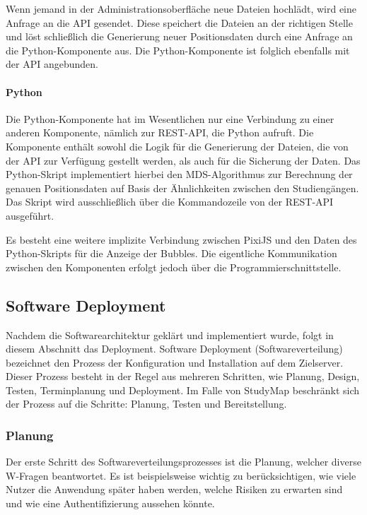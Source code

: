 Wenn jemand in der Administrationsoberfläche neue Dateien hochlädt, wird eine Anfrage an die API gesendet. Diese speichert die Dateien an der richtigen Stelle und löst schließlich die Generierung neuer Positionsdaten durch eine Anfrage an die Python-Komponente aus. Die Python-Komponente ist folglich ebenfalls mit der API angebunden.

\paragraph*{Python}
Die Python-Komponente hat im Wesentlichen nur eine Verbindung zu einer anderen Komponente, nämlich zur REST-API, die Python aufruft. Die Komponente enthält sowohl die Logik für die Generierung der Dateien, die von der API zur Verfügung gestellt werden, als auch für die Sicherung der Daten. Das Python-Skript implementiert hierbei den MDS-Algorithmus zur Berechnung der genauen Positionsdaten auf Basis der Ähnlichkeiten zwischen den Studiengängen. Das Skript wird ausschließlich über die Kommandozeile von der REST-API ausgeführt.

Es besteht eine weitere implizite Verbindung zwischen PixiJS und den Daten des Python-Skripts für die Anzeige der Bubbles. Die eigentliche Kommunikation zwischen den Komponenten erfolgt jedoch über die Programmierschnittstelle.

\newpage
\subsection{Software Deployment}\label{sec:deployment}
Nachdem die Softwarearchitektur geklärt und implementiert wurde, folgt in diesem Abschnitt das Deployment. Software Deployment (Softwareverteilung) bezeichnet den Prozess der Konfiguration und Installation auf dem Zielserver. Dieser Prozess besteht in der Regel aus mehreren Schritten, wie Planung, Design, Testen, Terminplanung und Deployment. \parencite{atera_team_was_2023} Im Falle von StudyMap beschränkt sich der Prozess auf die Schritte: Planung, Testen und Bereitstellung.

\subsubsection{Planung}
Der erste Schritt des Softwareverteilungsprozesses ist die Planung, welcher diverse W-Fragen beantwortet. Es ist beispielsweise wichtig zu berücksichtigen, wie viele Nutzer die Anwendung später haben werden, welche Risiken zu erwarten sind und wie eine Authentifizierung aussehen könnte. \parencite{atera_team_was_2023}

